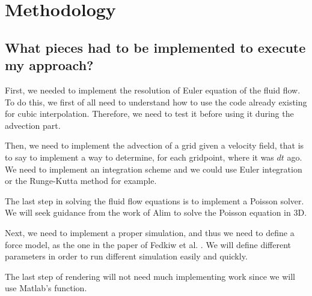 \documentclass[accepted,single]{gipaper}
\begin{document}



\section{Methodology}

\subsection{What pieces had to be implemented to execute my approach?}

First, we needed to implement the resolution of Euler equation of the fluid flow. To do this, we first of all need to understand how to use the code already existing for cubic interpolation. Therefore, we need to test it before using it during the advection part.

Then, we need to implement the advection of a grid given a velocity field, that is to say to implement a way to determine, for each gridpoint, where it was $dt$ ago. We need to implement an integration scheme and we could use Euler integration or the Runge-Kutta method for example.

The last step in solving the fluid flow equations is to implement a Poisson solver. We will seek guidance from the work of Alim \cite{alim:ms} to solve the Poisson equation in 3D.

Next, we need to implement a proper simulation, and thus we need to define a force model, as the one in the paper of Fedkiw et al. \cite{Fedkiw:2001}. We will define different parameters in order to run different simulation easily and quickly.

The last step of rendering will not need much implementing work since we will use Matlab's function.

\end{document}
